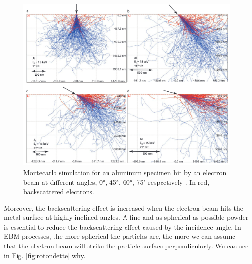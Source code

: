 \begin{figure}
    \centering
    \includegraphics[scale=0.35]{Images/backscattering.png}
    \caption[Backscattering of an electron at different angles.]{Montecarlo simulation for an aluminum specimen hit by an electron beam at different angles, \ang{0}, \ang{45}, \ang{60}, \ang{75} respectively \cite{goldstein_scanning_2018}. In red, backscattered electrons.}
    \label{fig:backscattering}
\end{figure}
Moreover, the backscattering effect is increased when the electron beam hits the metal surface at highly inclined angles. A fine and as spherical as possible powder is essential to reduce the backscattering effect caused by the incidence angle. In EBM processes, the more spherical the particles are, the more we can assume that the electron beam will strike the particle surface perpendicularly. We can see in Fig. \ref{fig:rotondette} why.
